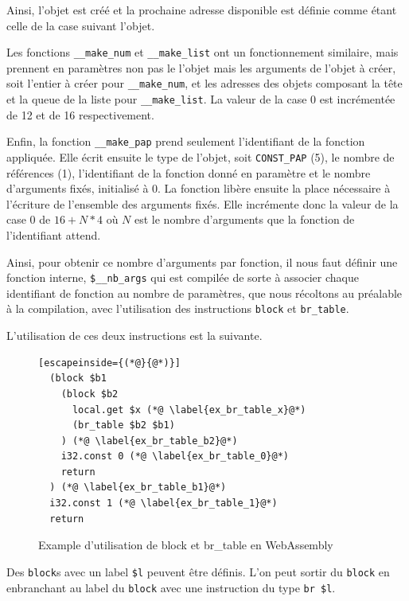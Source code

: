 \documentclass{rapportECL}
\begin{document}
Ainsi, l'objet est créé et la prochaine adresse disponible est définie comme étant celle de la case suivant l'objet.

\bigskip

Les fonctions \verb|__make_num| et \verb|__make_list| ont un fonctionnement similaire, mais prennent en paramètres non pas le 
l'objet mais les arguments de l'objet à créer, soit l'entier à créer pour \verb|__make_num|, et les adresses des objets composant la tête et la 
queue de la liste pour \verb|__make_list|. La valeur de la case 0 est incrémentée de 12 et de 16 respectivement.

\bigskip

Enfin, la fonction \verb|__make_pap| prend seulement l'identifiant de la fonction appliquée. Elle écrit ensuite le type de l'objet, 
soit \verb|CONST_PAP| (5), le nombre de références (1), l'identifiant de la fonction donné en paramètre et le nombre d'arguments 
fixés, initialisé à 0. La fonction libère ensuite la place nécessaire à l'écriture de l'ensemble des arguments fixés.
Elle incrémente donc la valeur de la case 0 de $16 + N * 4 $ où $N$ est le nombre d'arguments que la fonction de l'identifiant attend.

Ainsi, pour obtenir ce nombre d'arguments par fonction, il nous faut définir une fonction interne, \verb|$__nb_args| qui est 
compilée de sorte à associer chaque identifiant de fonction au nombre de paramètres, que nous récoltons au préalable à la 
compilation, avec l'utilisation des instructions \verb|block| et \verb|br_table|.

L'utilisation de ces deux instructions est la suivante.

\begin{figure}[H]
	\begin{lstlisting}[escapeinside={(*@}{@*)}]
  (block $b1
    (block $b2
      local.get $x (*@ \label{ex_br_table_x}@*)
      (br_table $b2 $b1)
    ) (*@ \label{ex_br_table_b2}@*)
    i32.const 0 (*@ \label{ex_br_table_0}@*)
    return
  ) (*@ \label{ex_br_table_b1}@*)
  i32.const 1 (*@ \label{ex_br_table_1}@*)
  return
	\end{lstlisting}
	\caption{Example d'utilisation de block et br\_table en WebAssembly}
	\label{listing:example_block_br_table}
\end{figure}

Des \verb|block|s avec un label \verb|$l| peuvent être définis. L'on peut sortir du \verb|block| en enbranchant au label du 
\verb|block| avec une instruction du type \verb|br $l|.
\end{document}
